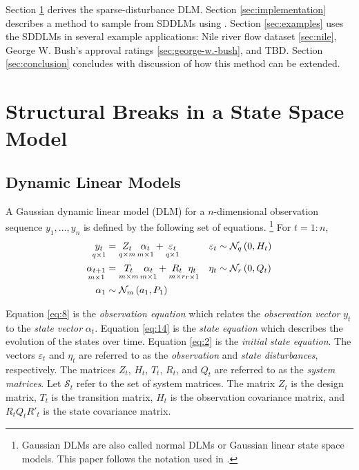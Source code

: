 \documentclass{article}
\begin{document}
Section \ref{sec:struct-breaks-state} derives the sparse-disturbance DLM.
Section \ref{sec:implementation} describes a method to sample from SDDLMs using \Stan{}.
Section \ref{sec:examples} uses the SDDLMs in several example applications: Nile river flow dataset \ref{sec:nile}, George W. Bush's approval ratings \ref{sec:george-w.-bush}, and TBD.
Section \ref{sec:conclusion} concludes with discussion of how this method can be extended.

\section{Structural Breaks in a State Space Model}
\label{sec:struct-breaks-state}

\subsection{Dynamic Linear Models}
\label{sec:dynam-line-models}

A Gaussian dynamic linear model (DLM) for a $n$-dimensional observation sequence $y_{1}, \dots, y_{n}$ is defined by the following set of equations.%
\footnote{
Gaussian DLMs are also called normal DLMs or Gaussian linear state space models.
This paper follows the notation used in \textcite{DurbinKoopman2001}.
}
For $t = 1:n$,
\begin{align}
  \label{eq:8}
  \underset{q \times 1}{y_t} &= \underset{q \times m}{Z_{t}} \, \underset{m \times 1}{\alpha_t} + \underset{q \times 1}{\varepsilon_t} & \varepsilon_{t} &\sim \dmvnorm{0, H_{t}}{q} \\
  \label{eq:14}
  \underset{m \times 1}{\alpha_{t+1}} &= \underset{m \times m}{T_{t}} \, \underset{m \times 1}{\alpha_{t}} + \underset{m \times r}{R_{t}}  \underset{r \times 1}{\eta_{t}} & \eta_{t} &\sim \dmvnorm{0, Q_{t}}{r} \\
  \label{eq:2}
  \alpha_{1} & \sim \dmvnorm{a_{1}, P_{1}}{m}
\end{align}


Equation \eqref{eq:8} is the \textit{observation equation} which relates the \textit{observation vector} $y_{t}$ to the \textit{state vector} $\alpha_{t}$.
Equation \eqref{eq:14} is the \textit{state equation} which describes the evolution of the states over time.
Equation \eqref{eq:2} is the \textit{initial state equation}.
The vectors $\varepsilon_{t}$ and $\eta_{t}$ are referred to as the \textit{observation} and \textit{state disturbances}, respectively.
The matrices $Z_{t}$, $H_{t}$, $T_{t}$, $R_{t}$, and $Q_{t}$ are referred to as the \textit{system matrices}.
Let $\mathcal{S}_{t}$ refer to the set of system matrices.
The matrix $Z_{t}$ is the design matrix, $T_{t}$ is the transition matrix, $H_{t}$ is the observation covariance matrix, and $R_{t} Q_{t} R'_{t}$ is the state covariance matrix.
\end{document}
